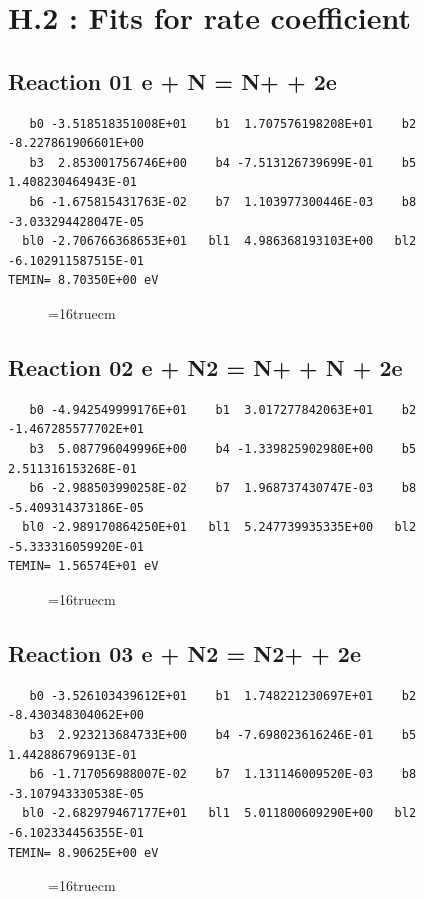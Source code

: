 \documentclass[12pt,dvipdfm]{article}
\begin{document}
\section{H.2 : Fits for rate coefficient }

\subsection{
Reaction 01 e + N = N+ + 2e }
\begin{small}\begin{verbatim}
   b0 -3.518518351008E+01    b1  1.707576198208E+01    b2 -8.227861906601E+00
   b3  2.853001756746E+00    b4 -7.513126739699E-01    b5  1.408230464943E-01
   b6 -1.675815431763E-02    b7  1.103977300446E-03    b8 -3.033294428047E-05
  bl0 -2.706766368653E+01   bl1  4.986368193103E+00   bl2 -6.102911587515E-01
TEMIN= 8.70350E+00 eV
   \end{verbatim}\end{small}
\begin{figure}[h!]
\label{n2rates}
\epsfxsize=16truecm
\end{figure}
\newpage

\subsection{
Reaction 02 e + N2 = N+ + N + 2e}
\begin{small}\begin{verbatim}
   b0 -4.942549999176E+01    b1  3.017277842063E+01    b2 -1.467285577702E+01
   b3  5.087796049996E+00    b4 -1.339825902980E+00    b5  2.511316153268E-01
   b6 -2.988503990258E-02    b7  1.968737430747E-03    b8 -5.409314373186E-05
  bl0 -2.989170864250E+01   bl1  5.247739935335E+00   bl2 -5.333316059920E-01
TEMIN= 1.56574E+01 eV
   \end{verbatim}\end{small}
\begin{figure}[h!]
\label{n2rates}
\epsfxsize=16truecm
\end{figure}
\newpage

\subsection{
Reaction 03 e + N2 = N2+ + 2e}
\begin{small}\begin{verbatim}
   b0 -3.526103439612E+01    b1  1.748221230697E+01    b2 -8.430348304062E+00
   b3  2.923213684733E+00    b4 -7.698023616246E-01    b5  1.442886796913E-01
   b6 -1.717056988007E-02    b7  1.131146009520E-03    b8 -3.107943330538E-05
  bl0 -2.682979467177E+01   bl1  5.011800609290E+00   bl2 -6.102334456355E-01
TEMIN= 8.90625E+00 eV
   \end{verbatim}\end{small}
\begin{figure}[h!]
\label{n2rates}
\epsfxsize=16truecm
\end{figure}
\newpage
\end{document}
